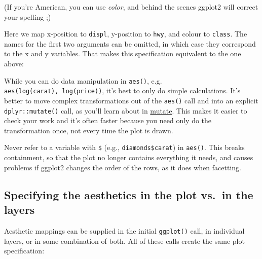 (If you're American, you can use \emph{color}, and behind the scenes
ggplot2 will correct your spelling ;)

Here we map x-position to \texttt{displ}, y-position to \texttt{hwy},
and colour to \texttt{class}. The names for the first two arguments can
be omitted, in which case they correspond to the x and y variables. That
makes this specification equivalent to the one above:

\begin{Shaded}
\begin{Highlighting}[]
 
\end{Highlighting}
\end{Shaded}

While you can do data manipulation in \texttt{aes()}, e.g.
\texttt{aes(log(carat),\ log(price))}, it's best to only do simple
calculations. It's better to move complex transformations out of the
\texttt{aes()} call and into an explicit \texttt{dplyr::mutate()} call,
as you'll learn about in \hyperref[mutate]{mutate}. This makes it easier
to check your work and it's often faster because you need only do the
transformation once, not every time the plot is drawn.

Never refer to a variable with \texttt{\$} (e.g.,
\texttt{diamonds\$carat}) in \texttt{aes()}. This breaks containment, so
that the plot no longer contains everything it needs, and causes
problems if ggplot2 changes the order of the rows, as it does when
facetting. \indexc{\$}

\subsection{Specifying the aesthetics in the plot vs.~in the
layers}\label{sub:plots-and-layers}

Aesthetic mappings can be supplied in the initial \texttt{ggplot()}
call, in individual layers, or in some combination of both. All of these
calls create the same plot specification:

\begin{Shaded}
\begin{Highlighting}[]
 \StringTok{ }
\StringTok{  }\NormalTok{()}
\StringTok{ }
\StringTok{  }\NormalTok{(}\NormalTok{(} 
\StringTok{ }
\StringTok{  }\NormalTok{(}\NormalTok{(}  
\StringTok{ }
\StringTok{  }\NormalTok{(} 
\end{Highlighting}
\end{Shaded}

